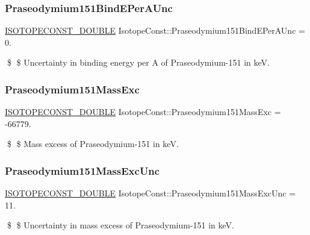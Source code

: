 \subsubsection{\texorpdfstring{Praseodymium151\+Bind\+E\+Per\+A\+Unc}{Praseodymium151BindEPerAUnc}}
{\footnotesize\ttfamily \mbox{\hyperlink{group___isotope_const-_macros_ga8f45a7272ce02c0b4c65c44636ed719a}{I\+S\+O\+T\+O\+P\+E\+C\+O\+N\+S\+T\+\_\+\+D\+O\+U\+B\+LE}} Isotope\+Const\+::\+Praseodymium151\+Bind\+E\+Per\+A\+Unc = 0.}

\$ \$ Uncertainty in binding energy per A of Praseodymium-\/151 in keV. \mbox{\label{group___isotope_const-_praseodymium-_pr151_ga368b3fa4cfaa5421af60081700b81261}} 
\subsubsection{\texorpdfstring{Praseodymium151\+Mass\+Exc}{Praseodymium151MassExc}}
{\footnotesize\ttfamily \mbox{\hyperlink{group___isotope_const-_macros_ga8f45a7272ce02c0b4c65c44636ed719a}{I\+S\+O\+T\+O\+P\+E\+C\+O\+N\+S\+T\+\_\+\+D\+O\+U\+B\+LE}} Isotope\+Const\+::\+Praseodymium151\+Mass\+Exc = -\/66779.}

\$ \$ Mass excess of Praseodymium-\/151 in keV. \mbox{\label{group___isotope_const-_praseodymium-_pr151_ga43d2257e63476ef5e7a23e31b4a04778}} 
\subsubsection{\texorpdfstring{Praseodymium151\+Mass\+Exc\+Unc}{Praseodymium151MassExcUnc}}
{\footnotesize\ttfamily \mbox{\hyperlink{group___isotope_const-_macros_ga8f45a7272ce02c0b4c65c44636ed719a}{I\+S\+O\+T\+O\+P\+E\+C\+O\+N\+S\+T\+\_\+\+D\+O\+U\+B\+LE}} Isotope\+Const\+::\+Praseodymium151\+Mass\+Exc\+Unc = 11.}

\$ \$ Uncertainty in mass excess of Praseodymium-\/151 in keV. \mbox{\label{group___isotope_const-_praseodymium-_pr151_gacf4b58525816b8f0b1c696ba9f9c1bb1}} 
